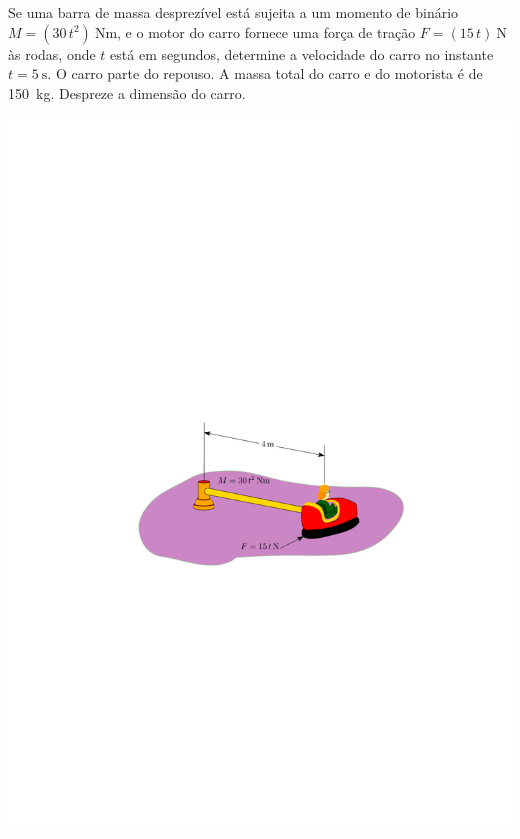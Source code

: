 \item Se uma barra de massa desprezível está sujeita a um momento de binário $M=(30\,t^{2})\SI{}{\newton\meter}$, e o motor do carro fornece uma força de tração $F=(15\,t)\SI{}{\newton}$ às rodas, onde $t$ está em segundos, determine a velocidade do carro no instante $t=\SI{5}{\second}$. O carro parte do repouso. A massa total do carro e do motorista é de \SI{150}{\kilogram}. Despreze a dimensão do carro.

\begin{flushright}
	\includegraphics[scale=1.3]{images/draw_12}
\end{flushright}